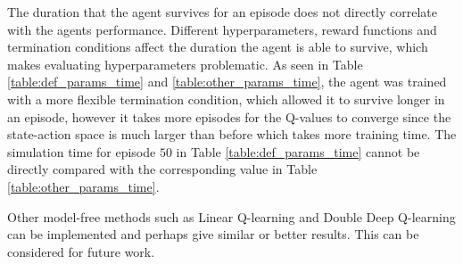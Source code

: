 \documentclass[final]{LTHtwocol} %
\begin{document}
The duration that the agent survives for an episode does not directly correlate with the agents performance.
Different hyperparameters, reward functions and termination conditions affect the duration the agent is able to survive, which makes evaluating hyperparameters problematic.
As seen in Table \ref{table:def_params_time} and \ref{table:other_params_time}, the agent was trained with a more flexible termination condition, which allowed it to survive longer in an episode, however it takes more episodes for the Q-values to converge since the state-action space is much larger than before which takes more training time.
The simulation time for episode $50$ in Table \ref{table:def_params_time} cannot be directly compared with the corresponding value in Table \ref{table:other_params_time}.


Other model-free methods such as Linear Q-learning \cite{Linear_Q_Learning} and Double Deep Q-learning \cite{Deep_Double_Q_Learning} can be implemented and perhaps give similar or better results.
This can be considered for future work.


\printbibliography
\end{document}
